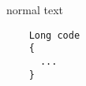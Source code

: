 \documentclass{beamer}
\begin{document}
\begin{frame}[fragile]

normal text

  \fontsize{5pt}{7pt}
  \selectfont
  \begin{lstlisting}
    Long code
    {
      ...
    }
  \end{lstlisting}
\end{frame}
\end{document}
